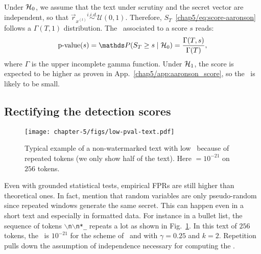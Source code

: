 \paragraph*{\texorpdfstring{\citep{aaronson2023watermarking}}{}} 
Under $\mathcal{H}_0$, we assume that the text under scrutiny and the secret vector are independent, so that $\vec{r}_{x^{(t)}} \overset{i.i.d.}{\sim} \mathcal{U}(0,1)$. 
Therefore, $S_T$~\eqref{chap5/eq:score-aaronson} follows a $\Gamma(T,1)$ distribution.
The \pval\ associated to a score $s$ reads:
\begin{equation}
    \text{p-value}(s) = \Prob(S_T \geq s \mid \H_0) = \frac{\Gamma(T,s)}{\Gamma(T)},
\end{equation}
where $\Gamma$ is the upper incomplete gamma function.
Under $\mathcal{H}_1$, the score is expected to be higher as proven in App.~\ref{chap5/app:aaronson_score}, so the \pval\ is likely to be small.




    
    


\subsection{Rectifying the detection scores}\label{chap5/sec:rect}


\begin{figure}[b!]
    \centering
    \begin{tcolorbox}[width=0.7\linewidth, colframe=metablue, colback=white]
        \texttt{[image: chapter-5/figs/low-pval-text.pdf]}
    \end{tcolorbox}
    \centering
    \caption{
    Typical example of a non-watermarked text with low \pval\ because of repeated tokens (we only show half of the text).
    Here \pval$=10^{-21}$ on $256$ tokens.
    }
    \label{chap5/fig:low-pval-text}
\end{figure}

Even with grounded statistical tests, empirical FPRs are still higher than theoretical ones.
In fact, \citet{kirchenbauer2023watermark} mention that random variables are only pseudo-random since repeated windows generate the same secret. 
This can happen even in a short text and especially in formatted data.
For instance in a bullet list, the sequence of tokens \texttt{$\backslash$n$\backslash$n*\_} repeats a lot as shown in Fig.~\ref{chap5/fig:low-pval-text}.
In this text of $256$ tokens, the \pval\ is $10^{-21}$ for the scheme of~\citet{kirchenbauer2023watermark} and with $\gamma=0.25$ and $k=2$.
Repetition pulls down the assumption of independence necessary for computing the \pval.

